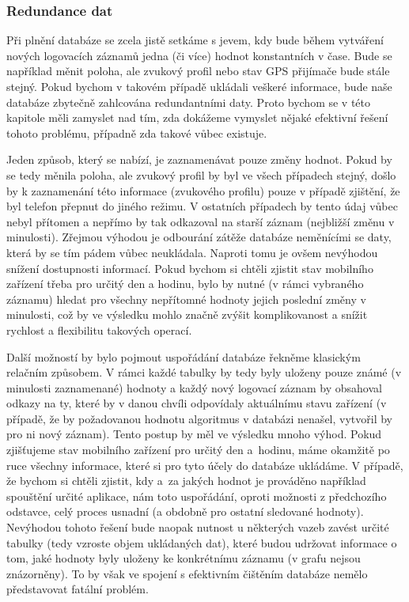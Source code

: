 \documentclass[thesis=M,czech]{FITthesis}[2012/06/26]
\begin{document}
\subsubsection*{Redundance dat}
Při plnění databáze se zcela jistě setkáme s jevem, kdy bude během vytváření nových logovacích záznamů jedna (či více) hodnot konstantních v čase. Bude se například měnit poloha, ale zvukový profil nebo stav GPS přijímače bude stále stejný. Pokud bychom v takovém případě ukládali veškeré informace, bude naše databáze zbytečně zahlcována redundantními daty. Proto bychom se v této kapitole měli zamyslet nad tím, zda dokážeme vymyslet nějaké efektivní řešení tohoto problému, případně zda takové vůbec existuje.

Jeden způsob, který se nabízí, je zaznamenávat pouze změny hodnot. Pokud by se tedy měnila poloha, ale zvukový profil by byl ve všech případech stejný, došlo by k zaznamenání této informace (zvukového profilu) pouze v případě zjištění, že byl telefon přepnut do jiného režimu. V ostatních případech by tento údaj vůbec nebyl přítomen a nepřímo by tak odkazoval na starší záznam (nejbližší změnu v minulosti). Zřejmou výhodou je odbourání zátěže databáze neměnícími se daty, která by se tím pádem vůbec neukládala. Naproti tomu je ovšem nevýhodou snížení dostupnosti informací. Pokud bychom si chtěli zjistit stav mobilního zařízení třeba pro určitý den a hodinu, bylo by nutné (v rámci vybraného záznamu) hledat pro všechny nepřítomné hodnoty jejich poslední změny v minulosti, což by ve výsledku mohlo značně zvýšit komplikovanost a snížit rychlost a flexibilitu takových operací.

Další možností by bylo pojmout uspořádání databáze řekněme klasickým relačním způsobem. V rámci každé tabulky by tedy byly uloženy pouze známé (v minulosti zaznamenané) hodnoty a každý nový logovací záznam by obsahoval odkazy na ty, které by v danou chvíli odpovídaly aktuálnímu stavu zařízení (v případě, že by požadovanou hodnotu algoritmus v databázi nenašel, vytvořil by pro ni nový záznam). Tento postup by měl ve výsledku mnoho výhod. Pokud zjišťujeme stav mobilního zařízení pro určitý den a~hodinu, máme okamžitě po ruce všechny informace, které si pro tyto účely do databáze ukládáme. V případě, že bychom si chtěli zjistit, kdy a~za jakých hodnot je prováděno například spouštění určité aplikace, nám toto uspořádání, oproti možnosti z předchozího odstavce, celý proces usnadní (a obdobně pro ostatní sledované hodnoty). Nevýhodou tohoto řešení bude naopak nutnost u některých vazeb zavést určité  tabulky (tedy vzroste objem ukládaných dat), které budou udržovat informace o tom, jaké hodnoty byly uloženy ke konkrétnímu záznamu (v grafu nejsou znázorněny). To by však ve spojení s efektivním čištěním databáze nemělo představovat fatální problém.
\end{document}
